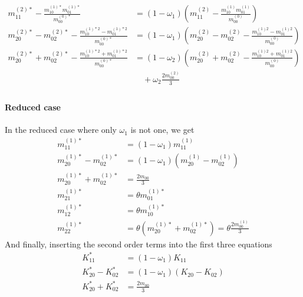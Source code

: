 \begin{equation}
  \begin{aligned}
    m_{11}^{(2)*} - \frac{ m_{10}^{(1)*}m_{01}^{(1)*}}{m_{00}^{(0)*}} & = (1-\omega_1)\left(m_{11}^{(2)} - \frac{ m_{10}^{(1)}m_{01}^{(1)}}{m_{00}^{(0)}}\right) \\
    m_{20}^{(2)*}-m_{02}^{(2)*} - \frac{ m_{10}^{(1)*2} - m_{01}^{(1)*2}}{m_{00}^{(0)*}} & = (1-\omega_1) \left(m_{20}^{(2)}-m_{02}^{(2)} - \frac{ m_{10}^{(1)2} - m_{01}^{(1)2}}{m_{00}^{(0)}}\right) \\
    m_{20}^{(2)*}+m_{02}^{(2)*} - \frac{ m_{10}^{(1)*2} + m_{01}^{(1)*2}}{m_{00}^{(0)*}} & = (1-\omega_2)
    \left(m_{20}^{(2)}+m_{02}^{(2)} - \frac{ m_{10}^{(1)2} + m_{01}^{(1)2}}{m_{00}^{(0)}}\right)
    \\&\quad
    + \omega_2 \frac{2 m_{00}^{(2)}}{3} \\
  \end{aligned}
\end{equation}

\paragraph{Reduced case}
\label{par:Reduced case}
In the reduced case where only $\omega_1$ is not one, we get
\begin{equation}
  \begin{aligned}
    m_{11}^{(1)*} & = (1-\omega_1) m_{11}^{(1)} \\
    m_{20}^{(1)*} - m_{02}^{(1)*}
      & = (1-\omega_1) (m_{20}^{(1)} - m_{02}^{(1)}) \\
    m_{20}^{(1)*} + m_{02}^{(1)*}
      & =  \frac{2 m_{00}}{3} \\
    m_{21}^{(1)*} & = \theta m_{01}^{(1)*} \\
    m_{12}^{(1)*} & = \theta m_{10}^{(1)*} \\
    m_{22}^{(1)*} & = \theta (m_{20}^{(1)*} + m_{02}^{(1)*}) = \theta \frac{2 m_{00}^{(1)}}{3}
  \end{aligned}
\end{equation}
And finally, inserting the second order terms into the first three equations
\begin{equation}
  \begin{aligned}
    K_{11}^{*} & = (1-\omega_1)K_{11} \\
    K_{20}^{*} - K_{02}^{*}
      & = (1-\omega_1) (K_{20} - K_{02}) \\
    K_{20}^{*} + K_{02}^{*}
      & =  \frac{2 m_{00}}{3} \\
  \end{aligned}
\end{equation}
